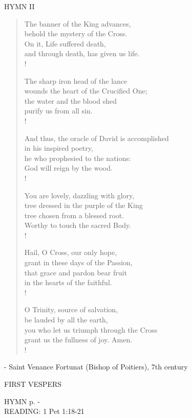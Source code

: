 \noindent\small{\uppercase{Hymn II}}\normalsize\label{palmsunday:lastHymn}
\begin{verse}
The banner of the King advances,\\
behold the mystery of the Cross.\\
On it, Life suffered death,\\
and through death, has given us life.\\!

The sharp iron head of the lance\\
wounds the heart of the Crucified One;\\
the water and the blood shed\\
purify us from all sin.\\!

And thus, the oracle of David is accomplished\\
in his inspired poetry,\\
he who prophesied to the nations:\\
God will reign by the wood.\\!

You are lovely, dazzling with glory,\\
tree dressed in the purple of the King\\
tree chosen from a blessed root.\\
Worthy to touch the sacred Body.\\!

Hail, O Cross, our only hope,\\
grant in these days of the Passion,\\
that grace and pardon bear fruit\\
in the hearts of the faithful.\\!

O Trinity, source of salvation,\\
be lauded by all the earth,\\
you who let us triumph through the Cross\\
grant us the fullness of joy. Amen.\\!
\end{verse}

\begin{flushright}\tiny{- Saint Venance Fortunat (Bishop of Poitiers), 7th century}\end{flushright}

\begin{flushleft}\normalsize{\uppercase{FIRST VESPERS\\}}\end{flushleft}
\small{\uppercase{HYMN} p. \pageref{palmsunday:firstHymn}-\pageref{palmsunday:lastHymn}}\\
\small\noindent READING:    1 Pet 1:18-21    \textbf{\\}

